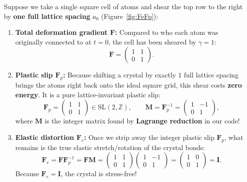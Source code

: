 \documentclass[11pt,a4paper]{article}
\newcommand{\Z}{\mathbb{Z}}
\begin{document}
Suppose we take a single square cell of atoms and shear the top row to the right by \textbf{one full
lattice spacing} $a_0$ (Figure~\ref{fig:FeFp}):
\begin{enumerate}
  \item \textbf{Total deformation gradient $\bm{F}$:} Compared to who each atom was originally connected to at $t=0$, the cell has been sheared by $\gamma = 1$:
        \[
          \bm{F} = \begin{pmatrix} 1 & 1 \\ 0 & 1 \end{pmatrix}.
        \]
  \item \textbf{Plastic slip $\bm{F}_p$:} Because shifting a crystal by exactly $1$ full lattice spacing brings the atoms right back onto the ideal square grid, this shear costs \textbf{zero energy}. It is a pure lattice-invariant plastic slip:
        \[
          \bm{F}_p = \begin{pmatrix} 1 & 1 \\ 0 & 1 \end{pmatrix} \in \mathrm{SL}(2,\Z), \qquad \bm{M} = \bm{F}_p^{-1} = \begin{pmatrix} 1 & -1 \\ 0 & 1 \end{pmatrix},
        \]
        where $\bm{M}$ is the integer matrix found by \textbf{Lagrange reduction} in our code!
  \item \textbf{Elastic distortion $\bm{F}_e$:} Once we strip away the integer plastic slip $\bm{F}_p$, what remains is the true elastic stretch/rotation of the crystal bonds:
        \[
          \bm{F}_e = \bm{F} \bm{F}_p^{-1} = \bm{F} \bm{M} = \begin{pmatrix} 1 & 1 \\ 0 & 1 \end{pmatrix} \begin{pmatrix} 1 & -1 \\ 0 & 1 \end{pmatrix} = \begin{pmatrix} 1 & 0 \\ 0 & 1 \end{pmatrix} = \bm{I}.
        \]
        Because $\bm{F}_e = \bm{I}$, the crystal is stress-free!
\end{enumerate}
\end{document}
